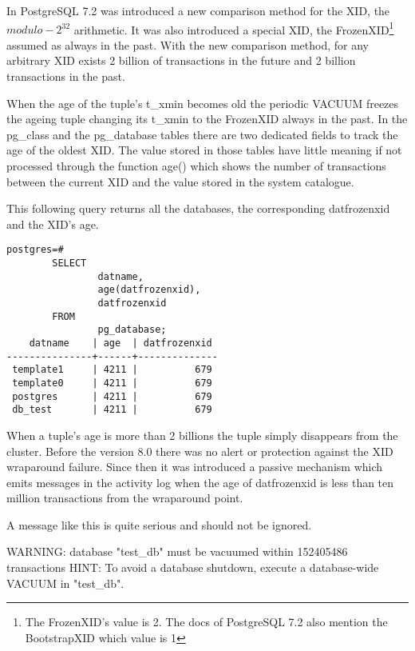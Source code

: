 In PostgreSQL 7.2 was introduced a new comparison method for the XID, the
\begin{math}modulo-2^{32}\end{math} arithmetic. It was also introduced a special XID, the
FrozenXID\footnote{The FrozenXID's value is 2. The docs of PostgreSQL
7.2 also mention the BootstrapXID which value is 1} assumed as always in the past. With the new
comparison method, for any arbitrary XID exists 2 billion of transactions in the future and 2 billion
transactions in the past.\newline

When the age of the tuple's t\_xmin becomes old the periodic VACUUM freezes the ageing tuple
changing its t\_xmin to the FrozenXID always in the past. In the pg\_class and the pg\_database tables
there are  two dedicated fields to track the age of the oldest XID. The value stored in those tables
have little meaning if not processed through the function age() which shows the number of transactions
between the current XID and the value stored in the system catalogue. \newline

This following query returns all the databases, the corresponding datfrozenxid and the XID's age.\newpage

\begin{lstlisting}[style=pgsql]
 postgres=#
        SELECT
                datname,
                age(datfrozenxid),
                datfrozenxid
        FROM
                pg_database;
    datname    | age  | datfrozenxid
---------------+------+--------------
 template1     | 4211 |          679
 template0     | 4211 |          679
 postgres      | 4211 |          679
 db_test       | 4211 |          679

\end{lstlisting}

When a tuple's age is more than 2 billions the tuple simply disappears  from the cluster. Before the
version 8.0 there was no alert or protection against the XID wraparound failure. Since then it was
introduced a passive mechanism which emits messages in the activity log when the age of datfrozenxid
is less than ten million transactions from the wraparound point.

A message like this is quite serious and should not be ignored.
\begin{smallverbatim}
WARNING:  database "test_db" must be vacuumed within 152405486 transactions
HINT:  To avoid a database shutdown, execute a database-wide VACUUM in
"test_db".
\end{smallverbatim}

